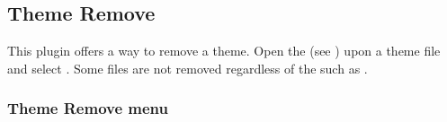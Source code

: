 \subsection{\label{ref:ThemeRemove}Theme Remove}
This plugin offers a way to remove a theme. Open the  (see ) 
upon a theme file and select .
Some files are not removed regardless of the  such as
.

\subsubsection{Theme Remove menu}
